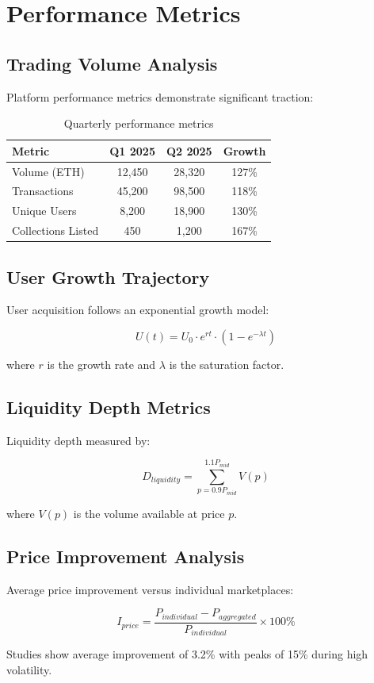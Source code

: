 \section{Performance Metrics}


\subsection{Trading Volume Analysis}

Platform performance metrics demonstrate significant traction:

\begin{table}[h]
\centering
\begin{tabular}{|l|c|c|c|}
\hline
\textbf{Metric} & \textbf{Q1 2025} & \textbf{Q2 2025} & \textbf{Growth} \\
\hline
Volume (ETH) & 12,450 & 28,320 & 127\% \\
Transactions & 45,200 & 98,500 & 118\% \\
Unique Users & 8,200 & 18,900 & 130\% \\
Collections Listed & 450 & 1,200 & 167\% \\
\hline
\end{tabular}
\caption{Quarterly performance metrics}
\end{table}

\subsection{User Growth Trajectory}

User acquisition follows an exponential growth model:

\begin{equation}
U(t) = U_0 \cdot e^{rt} \cdot (1 - e^{-\lambda t})
\end{equation}

where $r$ is the growth rate and $\lambda$ is the saturation factor.

\subsection{Liquidity Depth Metrics}

Liquidity depth measured by:

\begin{equation}
D_{liquidity} = \sum_{p=0.9P_{mid}}^{1.1P_{mid}} V(p)
\end{equation}

where $V(p)$ is the volume available at price $p$.

\subsection{Price Improvement Analysis}

Average price improvement versus individual marketplaces:

\begin{equation}
I_{price} = \frac{P_{individual} - P_{aggregated}}{P_{individual}} \times 100\%
\end{equation}

Studies show average improvement of 3.2\% with peaks of 15\% during high volatility.

